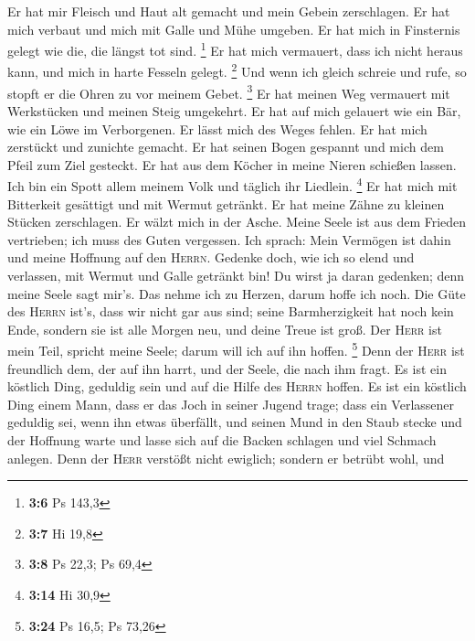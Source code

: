  Er hat mir Fleisch und Haut alt gemacht und mein Gebein
zerschlagen.  Er hat mich verbaut und mich mit Galle und
Mühe umgeben.  Er hat mich in Finsternis gelegt wie die,
die längst tot sind. \footnote{\textbf{3:6} Ps 143,3}  Er
hat mich vermauert, dass ich nicht heraus kann, und mich in harte
Fesseln gelegt. \footnote{\textbf{3:7} Hi 19,8}  Und wenn
ich gleich schreie und rufe, so stopft er die Ohren zu vor meinem Gebet.
\footnote{\textbf{3:8} Ps 22,3; Ps 69,4}  Er hat meinen
Weg vermauert mit Werkstücken und meinen Steig umgekehrt.
 Er hat auf mich gelauert wie ein Bär, wie ein Löwe im
Verborgenen.  Er lässt mich des Weges fehlen. Er hat mich
zerstückt und zunichte gemacht.  Er hat seinen Bogen
gespannt und mich dem Pfeil zum Ziel gesteckt.  Er hat
aus dem Köcher in meine Nieren schießen lassen.  Ich bin
ein Spott allem meinem Volk und täglich ihr Liedlein. \footnote{\textbf{3:14}
  Hi 30,9}  Er hat mich mit Bitterkeit gesättigt und mit
Wermut getränkt.  Er hat meine Zähne zu kleinen Stücken
zerschlagen. Er wälzt mich in der Asche.  Meine Seele ist
aus dem Frieden vertrieben; ich muss des Guten vergessen.
 Ich sprach: Mein Vermögen ist dahin und meine Hoffnung
auf den \textsc{Herrn}.  Gedenke doch, wie ich so elend
und verlassen, mit Wermut und Galle getränkt bin!  Du
wirst ja daran gedenken; denn meine Seele sagt mir's. 
Das nehme ich zu Herzen, darum hoffe ich noch.  Die Güte
des \textsc{Herrn} ist's, dass wir nicht gar aus sind; seine
Barmherzigkeit hat noch kein Ende,  sondern sie ist alle
Morgen neu, und deine Treue ist groß.  Der \textsc{Herr}
ist mein Teil, spricht meine Seele; darum will ich auf ihn hoffen.
\footnote{\textbf{3:24} Ps 16,5; Ps 73,26}  Denn der
\textsc{Herr} ist freundlich dem, der auf ihn harrt, und der Seele, die
nach ihm fragt.  Es ist ein köstlich Ding, geduldig sein
und auf die Hilfe des \textsc{Herrn} hoffen.  Es ist ein
köstlich Ding einem Mann, dass er das Joch in seiner Jugend trage;
 dass ein Verlassener geduldig sei, wenn ihn etwas
überfällt,  und seinen Mund in den Staub stecke und der
Hoffnung warte  und lasse sich auf die Backen schlagen
und viel Schmach anlegen.  Denn der \textsc{Herr}
verstößt nicht ewiglich;  sondern er betrübt wohl, und
